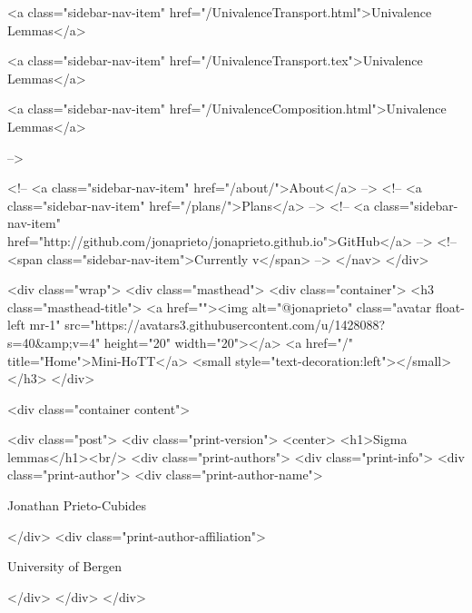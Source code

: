       
    
      
        
          <a class="sidebar-nav-item" href="/UnivalenceTransport.html">Univalence Lemmas</a>
        
      
    
      
        
          <a class="sidebar-nav-item" href="/UnivalenceTransport.tex">Univalence Lemmas</a>
        
      
    
      
        
          <a class="sidebar-nav-item" href="/UnivalenceComposition.html">Univalence Lemmas</a>
        
      
     -->

    <!-- <a class="sidebar-nav-item" href="/about/">About</a> -->
    <!-- <a class="sidebar-nav-item" href="/plans/">Plans</a> -->
    <!-- <a class="sidebar-nav-item" href="http://github.com/jonaprieto/jonaprieto.github.io">GitHub</a> -->
    <!-- <span class="sidebar-nav-item">Currently v</span> -->
  </nav>
</div>

    <div class="wrap">
      <div class="masthead">
        <div class="container">
          <h3 class="masthead-title">
            <a href=""><img alt="@jonaprieto" class="avatar float-left mr-1" src="https://avatars3.githubusercontent.com/u/1428088?s=40&amp;v=4" height="20" width="20"></a>
            <a href="/" title="Home">Mini-HoTT</a>
            <small style="text-decoration:left"></small>
          </h3>
        </div>
      
      <div class="container content">
        







<div class="post">
  <div class="print-version">
    <center>
      <h1>Sigma lemmas</h1><br/>
        <div class="print-authors">
          <div class="print-info">
            <div class="print-author">
              <div class="print-author-name">
                
                  Jonathan Prieto-Cubides
                
              </div>
              <div class="print-author-affiliation">
                
                  University of Bergen
                
                </div>
            </div>
          </div>
          
